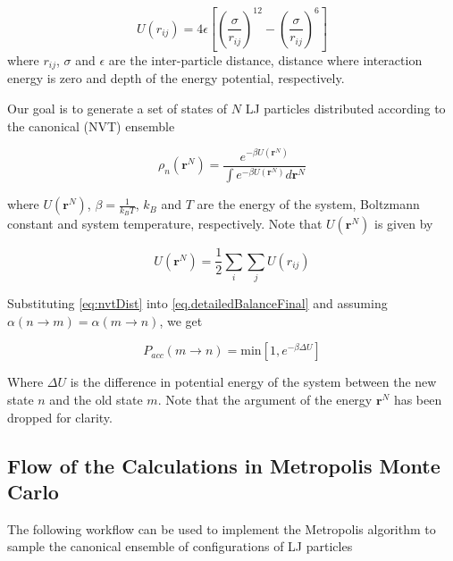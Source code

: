 \documentclass[aip,jcp,preprint,superscriptaddress,floatfix]{revtex4-1}
\begin{document}
\begin{equation}
U\left(r_{ij} \right) = 4 \epsilon \left[\left(\frac{\sigma}{r_{ij}}\right)^{12} -\left(\frac{\sigma}{r_{ij}}\right)^{6} \right]
\end{equation}
where $r_{ij}$, $\sigma$ and $\epsilon$ are the inter-particle distance, distance where interaction energy is zero and depth of the energy potential, respectively. 

Our goal is to generate a set of states of $N$ LJ particles distributed
according to the canonical (NVT) ensemble

\begin{equation}
	\rho_n \left(\textbf{r}^N \right) = \frac{ e^{-\beta U \left( \textbf{r}^N \right) }}{\int e^{-\beta U \left(  \textbf{r}^N \right)} d\textbf{r}^N }
	\label{eq:nvtDist}
\end{equation}


where $U \left( \textbf{r}^N \right)$, $\beta = \frac{1}{k_B T}$, $k_B$ and $T$ are the energy of the system, Boltzmann constant
and system temperature, respectively. Note that 
$U \left( \textbf{r}^N \right)$ is
given by

\begin{equation}
	U \left( \textbf{r}^N \right) = \frac{1}{2} \sum_i \sum_{j} U \left( r_{ij} \right)
\end{equation}

Substituting \ref{eq:nvtDist} into \ref{eq.detailedBalanceFinal} and
assuming $\alpha \left( n \rightarrow m \right) = 
\alpha \left( m \rightarrow n \right)$, we get

\begin{equation}
	P_{acc}(m \rightarrow n) = \text{min} \left[
		1,e^{-\beta \Delta U}
	\right]
	\label{eq.detailedBalanceNVT}
\end{equation}

Where $\Delta U$ is the difference in potential energy of the system
between the new state $n$ and the old state $m$. Note that the argument
of the energy $\textbf{r}^N$ has been dropped for clarity.

\subsection{Flow of the Calculations in Metropolis Monte Carlo}

The following workflow can be used to implement the Metropolis algorithm
to sample the canonical ensemble of configurations of LJ particles
\end{document}
